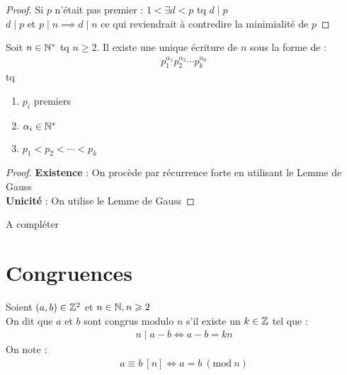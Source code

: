 \begin{proof}
Si $p$ n'était pas premier : $1 < \exists d < p$ tq $d \mid p$
\\
$d \mid p$ et $p \mid n \implies d \mid n$ ce qui reviendrait à contredire la minimialité de $p$
\end{proof}

\begin{graybox}
\begin{theoreme}
Soit $n \in \mathbb{N}^*$ tq $n \geq 2$. 
Il existe une unique écriture de $n$ sous la forme de :
\begin{align*}
p_1^{\alpha_1} p_2^{\alpha_2}  \cdots p_k^{\alpha_k}
\end{align*}
tq 
\begin{enumerate}
\item $p_i$ premiers
\item $\alpha_i \in \mathbb{N}^*$
\item $p_1 < p_2 < \cdots < p_k$
\end{enumerate}
\end{theoreme}
\end{graybox}

\begin{proof}
\textbf{Existence} : On procède par récurrence forte en utilisant le Lemme de Gauss \\
\textbf{Unicité} : On utilise le Lemme de Gauss
\end{proof}

\begin{proposition}
A compléter 
\end{proposition}

\section{Congruences}
\begin{graybox}
\begin{definition}[Congruence]
	Soient $(a, b) \in \mathbb{Z}^2$ et $n \in \mathbb{N}, n \geqslant 2$ \\
	On dit que $a$ et $b$ sont congrus modulo $n$ s'il existe un $k \in \mathbb{Z}$ tel que :
	\begin{align*}
	n \mid a - b \iff a - b = kn
	\end{align*}
	On note : 
	\begin{align*}
	a \equiv b \ [n] \iff a = b \ (\mathrm{mod}\ n)
	\end{align*}
\end{definition}
\end{graybox}

